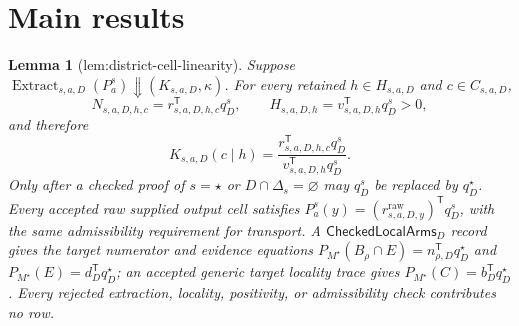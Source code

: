 \documentclass{article}
\newtheorem{lemma}{Lemma}
\begin{document}
\section{Main results}

\begin{lemma}[lem:district-cell-linearity]\label{lem:district-cell-linearity}
Suppose \(\operatorname{Extract}_{s,a,D}(P_a^s)\Downarrow(K_{s,a,D},\kappa)\).  For every retained \(h\in H_{s,a,D}\) and \(c\in C_{s,a,D}\),
\[
N_{s,a,D,h,c}=r_{s,a,D,h,c}^{\mathsf T}q_D^s,
\qquad
H_{s,a,D,h}=v_{s,a,D,h}^{\mathsf T}q_D^s>0,
\]
and therefore
\[
K_{s,a,D}(c\mid h)=
\frac{r_{s,a,D,h,c}^{\mathsf T}q_D^s}
{v_{s,a,D,h}^{\mathsf T}q_D^s}.
\]
Only after a checked proof of \(s=\star\) or \(D\cap\Delta_s=\varnothing\) may \(q_D^s\) be replaced by \(q_D^\star\).  Every accepted raw supplied output cell satisfies \(P_a^s(y)=(r^{\mathrm{raw}}_{s,a,D,y})^{\mathsf T}q_D^s\), with the same admissibility requirement for transport.  A \(\mathsf{CheckedLocalArms}_D\) record gives the target numerator and evidence equations \(P_{M^\star}(B_\rho\cap E)=n_{\rho,D}^{\mathsf T}q_D^\star\) and \(P_{M^\star}(E)=d_D^{\mathsf T}q_D^\star\); an accepted generic target locality trace gives \(P_{M^\star}(C)=b_D^{\mathsf T}q_D^\star\).  Every rejected extraction, locality, positivity, or admissibility check contributes no row.
\end{lemma}
\end{document}
